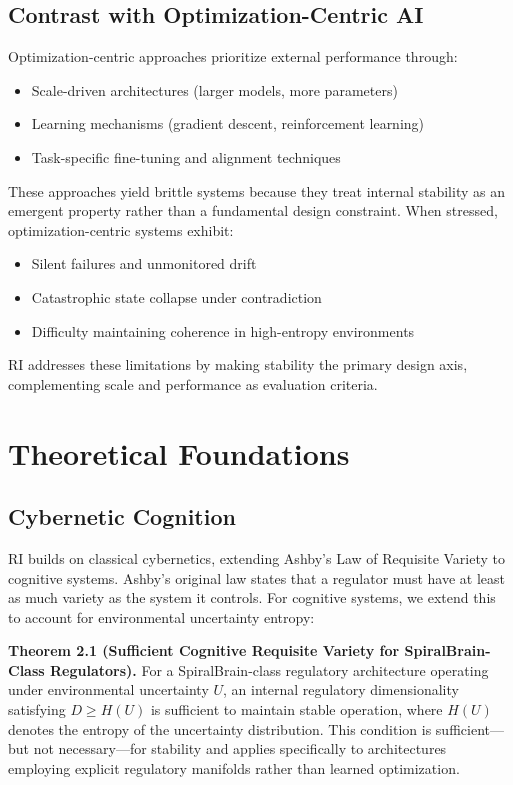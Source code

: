 \documentclass[12pt,a4paper]{report}
\begin{document}
\subsection{Contrast with Optimization-Centric AI}

Optimization-centric approaches prioritize external performance through:
\begin{itemize}
    \item Scale-driven architectures (larger models, more parameters)
    \item Learning mechanisms (gradient descent, reinforcement learning)
    \item Task-specific fine-tuning and alignment techniques
\end{itemize}

These approaches yield brittle systems because they treat internal stability as an emergent property rather than a fundamental design constraint. When stressed, optimization-centric systems exhibit:
\begin{itemize}
    \item Silent failures and unmonitored drift
    \item Catastrophic state collapse under contradiction
    \item Difficulty maintaining coherence in high-entropy environments
\end{itemize}

RI addresses these limitations by making stability the primary design axis, complementing scale and performance as evaluation criteria.

\section{Theoretical Foundations}

\subsection{Cybernetic Cognition}

RI builds on classical cybernetics, extending Ashby's Law of Requisite Variety \citep{ashby1958requisite} to cognitive systems. Ashby's original law states that a regulator must have at least as much variety as the system it controls. For cognitive systems, we extend this to account for environmental uncertainty entropy:

\textbf{Theorem 2.1 (Sufficient Cognitive Requisite Variety for SpiralBrain-Class Regulators).} For a SpiralBrain-class regulatory architecture operating under environmental uncertainty $U$, an internal regulatory dimensionality satisfying $D \ge H(U)$ is sufficient to maintain stable operation, where $H(U)$ denotes the entropy of the uncertainty distribution. This condition is sufficient—but not necessary—for stability and applies specifically to architectures employing explicit regulatory manifolds rather than learned optimization.
\end{document}
